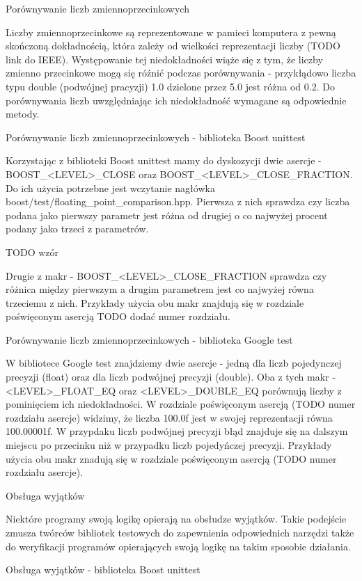 Porównywanie liczb zmiennoprzecinkowych

Liczby zmiennoprzecinkowe są reprezentowane w pamieci komputera z pewną skończoną dokładnością, która zależy od wielkości reprezentacji liczby (TODO link do IEEE). Występowanie tej niedokładności wiąże się z tym, że liczby zmienno przecinkowe mogą się róźnić podczas porównywania - przykłądowo liczba typu double (podwójnej pracyzji) 1.0 dzielone przez 5.0 jest różna od 0.2.
Do porównywania liczb uwzględniając ich niedokładność wymagane są odpowiednie metody.

Porównywanie liczb zmiennoprzecinkowych - biblioteka Boost unittest

Korzystając z biblioteki Boost unittest mamy do dyskozycji dwie asercje - BOOST_<LEVEL>_CLOSE oraz BOOST_<LEVEL>_CLOSE_FRACTION. Do ich użycia potrzebne jest wczytanie nagłówka boost/test/floating_point_comparison.hpp.
Pierwsza z nich sprawdza czy liczba podana jako pierwszy parametr jest różna od drugiej o co najwyżej procent podany jako trzeci z parametrów.

TODO wzór

Drugie z makr - BOOST_<LEVEL>_CLOSE_FRACTION sprawdza czy różnica między pierwszym a drugim parametrem jest co najwyżej równa trzeciemu z nich.
Przykłady użycia obu makr znajdują się w rozdziale poświęconym asercją TODO dodać numer rozdziału.

Porównywanie liczb zmiennoprzecinkowych - biblioteka Google test

W bibliotece Google test znajdziemy dwie asercje - jedną dla liczb pojedynczej precyzji (float) oraz dla liczb podwójnej precyzji (double).
Oba z tych makr - <LEVEL>_FLOAT_EQ oraz <LEVEL>_DOUBLE_EQ porównują liczby z pominięciem ich niedokładności. W rozdziale poświęconym asercją (TODO numer rozdziału asercje) widzimy, że liczba 100.0f jest w swojej reprezentacji równa 100.00001f. W przypdaku liczb podwójnej precyzji błąd znajduje się na dalszym miejscu po przecinku niż w przypadku liczb pojedyńczej precyzji.
Przykłady użycia obu makr znadują się w rozdziale poświęconym asercją (TODO numer rozdziału asercje).

Obsługa wyjątków

Niektóre programy swoją logikę opierają na obsłudze wyjątków. Takie podejście zmusza twórców bibliotek testowych do zapewnienia odpowiednich narzędzi także do weryfikacji programów opierających swoją logikę na takim sposobie działania. 

Obsługa wyjątków - biblioteka Boost unittest

